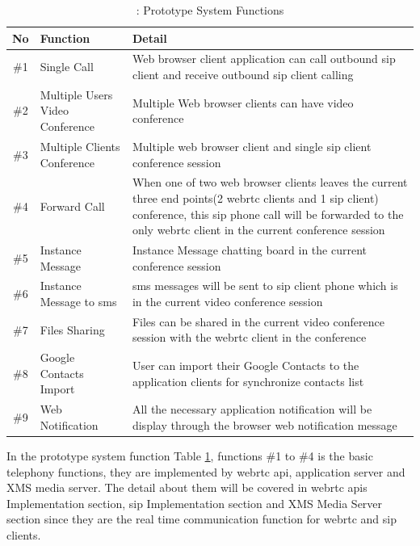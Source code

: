 \begin{table}
\caption{\label{tab:functions}: Prototype System Functions}
\centering
\begin{tabular}{| c | p{3cm} | p{5.5cm} |}
\hline
No & Function & Detail \\ \hline
\#1 & Single Call & Web browser client application can call outbound \gls{sip} client and receive outbound \gls{sip} client calling \\ \hline
\#2 & Multiple Users Video Conference & Multiple Web browser clients can have video conference \\ \hline
\#3 & Multiple Clients Conference & Multiple web browser client and single \gls{sip} client conference session \\ \hline
\#4 & Forward Call & When one of two web browser clients leaves the current three end points(2 \gls{webrtc} clients and 1 \gls{sip} client) conference, this \gls{sip} phone call will be forwarded to the only \gls{webrtc} client in the current conference session \\ \hline
\#5 & Instance Message & Instance Message chatting board in the current conference session \\ \hline
\#6 & Instance Message to \gls{sms} & \gls{sms} messages will be sent to \gls{sip} client phone which is in the current video conference session \\ \hline
\#7 & Files Sharing & Files can be shared in the current video conference session with the \gls{webrtc} client in the conference \\ \hline
\#8 & Google Contacts Import & User can import their Google Contacts to the application clients for synchronize contacts list \\ \hline
\#9 & Web Notification & All the necessary application notification will be display through the browser web notification message \\
\hline
\end{tabular} 
\end{table}

\par In the prototype system function Table \ref{tab:functions}, functions \#1 to \#4 is the basic telephony functions, they are implemented by \gls{webrtc} \gls{api}, application server and XMS media server. The detail about them will be covered in \gls{webrtc} \gls{api}s Implementation section, \gls{sip} Implementation section and XMS Media Server section since they are the real time communication function for \gls{webrtc} and \gls{sip} clients.

